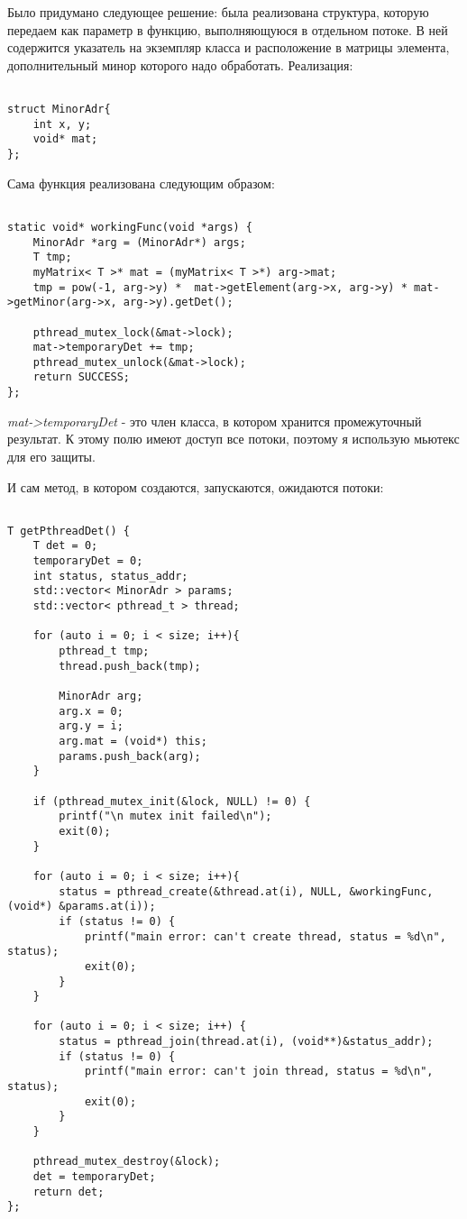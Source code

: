 \documentclass[10pt,a4paper]{report}
\begin{document}
	Было придумано следующее решение: была реализована структура, которую передаем как параметр в функцию, выполняющуюся в отдельном потоке. В ней содержится указатель на экземпляр класса и расположение в матрицы элемента, дополнительный минор которого надо обработать.
	Реализация:
	
	\begin{lstlisting}
	
struct MinorAdr{
	int x, y;
	void* mat;
};
	\end{lstlisting}
	
	Сама функция реализована следующим образом:
		
	\begin{lstlisting}
	
static void* workingFunc(void *args) {
	MinorAdr *arg = (MinorAdr*) args;
	T tmp; 
	myMatrix< T >* mat = (myMatrix< T >*) arg->mat;
	tmp = pow(-1, arg->y) *  mat->getElement(arg->x, arg->y) * mat->getMinor(arg->x, arg->y).getDet();

	pthread_mutex_lock(&mat->lock);
	mat->temporaryDet += tmp;
	pthread_mutex_unlock(&mat->lock);
	return SUCCESS;
};
	\end{lstlisting}
	
	\textit{mat->temporaryDet} - это член класса, в котором хранится промежуточный результат. К этому полю имеют доступ все потоки, поэтому я использую мьютекс для его защиты. 
		
	И сам метод, в котором создаются, запускаются, ожидаются потоки:
	
	\begin{lstlisting}

T getPthreadDet() {
	T det = 0;
	temporaryDet = 0;
	int status, status_addr;
	std::vector< MinorAdr > params;
	std::vector< pthread_t > thread;
	
	for (auto i = 0; i < size; i++){
		pthread_t tmp;
		thread.push_back(tmp);
		
		MinorAdr arg;
		arg.x = 0;
		arg.y = i;
		arg.mat = (void*) this;
		params.push_back(arg);
	}
	
	if (pthread_mutex_init(&lock, NULL) != 0) {
		printf("\n mutex init failed\n");
		exit(0);
	}
	
	for (auto i = 0; i < size; i++){
		status = pthread_create(&thread.at(i), NULL, &workingFunc, (void*) &params.at(i));
		if (status != 0) {
			printf("main error: can't create thread, status = %d\n", status);
			exit(0);
		}           
	}
	
	for (auto i = 0; i < size; i++) {
		status = pthread_join(thread.at(i), (void**)&status_addr);
		if (status != 0) {
			printf("main error: can't join thread, status = %d\n", status);
			exit(0);
		}      
	}
	
	pthread_mutex_destroy(&lock);
	det = temporaryDet;
	return det;
};
	\end{lstlisting}
\end{document}
